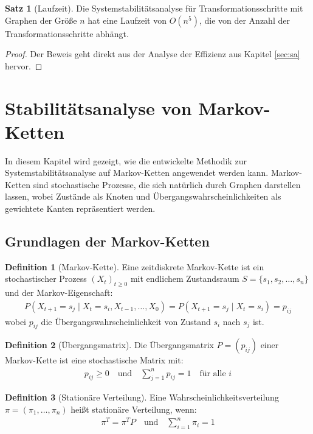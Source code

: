 \documentclass[a4paper,12pt]{article}
\theoremstyle{definition}
\newtheorem{definition}{Definition}
\newtheorem{satz}{Satz}
\begin{document}
\begin{satz}[Laufzeit]
	Die Systemstabilitätsanalyse für Transformationsschritte mit Graphen der Größe $n$ hat eine Laufzeit von $O(n^5)$, die von der Anzahl der Transformationsschritte abhängt.
\end{satz}

\begin{proof}
	Der Beweis geht direkt aus der Analyse der Effizienz aus Kapitel \ref{sec:sa} hervor.
\end{proof}

\section{Stabilitätsanalyse von Markov-Ketten}

In diesem Kapitel wird gezeigt, wie die entwickelte Methodik zur Systemstabilitätsanalyse auf Markov-Ketten angewendet werden kann. Markov-Ketten sind stochastische Prozesse, die sich natürlich durch Graphen darstellen lassen, wobei Zustände als Knoten und Übergangswahrscheinlichkeiten als gewichtete Kanten repräsentiert werden.

\subsection{Grundlagen der Markov-Ketten}

\begin{definition}[Markov-Kette]
	Eine zeitdiskrete Markov-Kette ist ein stochastischer Prozess $(X_t)_{t \geq 0}$ mit endlichem Zustandsraum $S = \{s_1, s_2, \ldots, s_n\}$ und der Markov-Eigenschaft:
	\begin{align}
		P(X_{t+1} = s_j \mid X_t = s_i, X_{t-1}, \ldots, X_0) = P(X_{t+1} = s_j \mid X_t = s_i) = p_{ij}
	\end{align}
	wobei $p_{ij}$ die Übergangswahrscheinlichkeit von Zustand $s_i$ nach $s_j$ ist.
\end{definition}

\begin{definition}[Übergangsmatrix]
	Die Übergangsmatrix $P = (p_{ij})$ einer Markov-Kette ist eine stochastische Matrix mit:
	\begin{align}
		p_{ij} \geq 0 \quad \text{und} \quad \sum_{j=1}^{n} p_{ij} = 1 \quad \text{für alle } i
	\end{align}
\end{definition}

\begin{definition}[Stationäre Verteilung]
	Eine Wahrscheinlichkeitsverteilung $\pi = (\pi_1, \ldots, \pi_n)$ heißt stationäre Verteilung, wenn:
	\begin{align}
		\pi^T = \pi^T P \quad \text{und} \quad \sum_{i=1}^{n} \pi_i = 1
	\end{align}
\end{definition}
\end{document}
